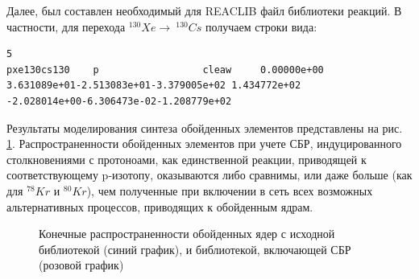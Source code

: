 \documentclass[14pt, a4paper]{article}
\begin{document}
Далее, был составлен необходимый для REACLIB файл библиотеки реакций. В частности, для перехода $^{130}Xe \to \ ^{130}Cs$ получаем строки вида:

\begin{lstlisting}[label={lst:label}]
5
pxe130cs130    p                  cleaw     0.00000e+00
3.631089e+01-2.513083e+01-3.379005e+02 1.434772e+02
-2.028014e+00-6.306473e-02-1.208779e+02

\end{lstlisting}


Результаты моделирования синтеза обойденных элементов представлены на рис. \ref{ris:result}. Распространенности обойденных элементов при учете СБР, индуцированного столкновениями с протоноами, как единственной реакции, приводящей к соответствующему p-изотопу, оказываются либо сравнимы, или даже больше (как для $^{78}Kr$ и $^{80}Kr$), чем полученные при включении в сеть всех возможных альтернативных процессов, приводящих к обойденным ядрам.
\begin{figure}[ht]
	\caption{Конечные распространенности обойденных ядер с исходной библиотекой (синий график), и библиотекой, включающей СБР (розовой график)}
	\label{ris:result}
\end{figure}

\end{document}
